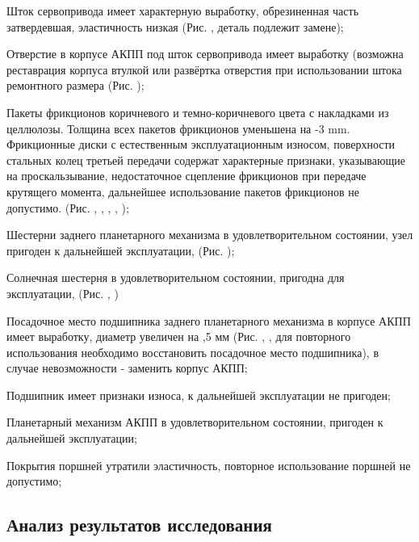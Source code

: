 Шток сервопривода имеет характерную выработку, обрезиненная часть затвердевшая, эластичность низкая (Рис. , деталь подлежит замене);

Отверстие в корпусе АКПП под шток сервопривода имеет выработку (возможна реставрация корпуса втулкой или развёртка  отверстия при использовании  штока  ремонтного размера (Рис. );

Пакеты фрикционов коричневого и темно-коричневого цвета с накладками из целлюлозы. Толщина всех пакетов фрикционов уменьшена на -3 mm.  Фрикционные диски  с естественным эксплуатационным износом, поверхности стальных колец  третьей передачи   содержат характерные признаки, указывающие на проскальзывание, недостаточное сцепление фрикционов при передаче крутящего момента, дальнейшее использование пакетов фрикционов не допустимо. (Рис. , , , , );

Шестерни заднего планетарного механизма в удовлетворительном состоянии, узел пригоден к дальнейшей эксплуатации, (Рис. ); 

Солнечная шестерня в удовлетворительном состоянии, пригодна для эксплуатации, (Рис. ,  )

Посадочное место подшипника заднего планетарного механизма в корпусе АКПП имеет  выработку, диаметр увеличен на ,5 мм (Рис. , , для повторного использования необходимо восстановить посадочное место подшипника), в случае невозможности - заменить корпус АКПП;

Подшипник имеет признаки износа, к дальнейшей эксплуатации не пригоден;

Планетарный механизм АКПП в удовлетворительном состоянии, пригоден к дальнейшей эксплуатации;

Покрытия поршней утратили эластичность, повторное использование поршней не допустимо;



 
\subsection{Анализ результатов исследования}

